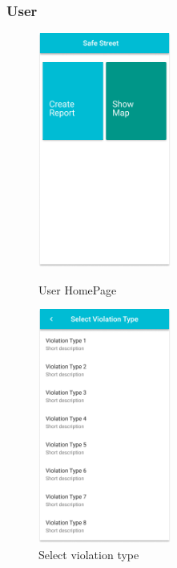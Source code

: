 \documentclass{article}
\begin{document}
\subsubsection{User}
\begin{figure}[!htb]
	\centering
	\begin{minipage}{.45\textwidth}
		\centering
		\includegraphics[height=7.7cm,keepaspectratio]{images/mockups/Home_Citizen.png}
		\caption{User HomePage}
	\end{minipage}\quad
	\begin{minipage}{.45\textwidth}
		\centering
		\includegraphics[height=7.7cm,keepaspectratio]{images/mockups/Violation_Type_Menu.png}
		\caption{Select violation type}
	\end{minipage}
\end{figure}
\end{document}

